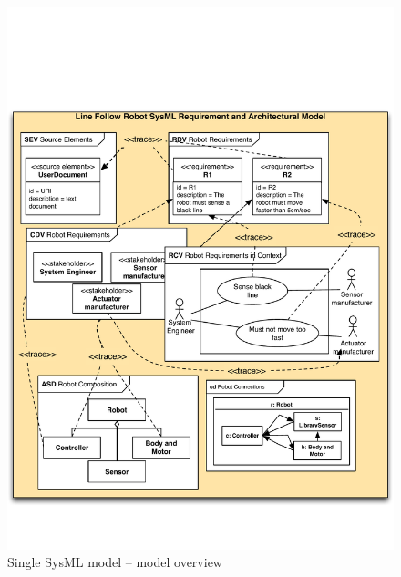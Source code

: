 \begin{description}
\begin{figure}
	\centering
	\includegraphics[scale=0.7]{figures/RE_1}
\caption{Single SysML model -- model overview}
\label{fig:re-singlesysml}
\end{figure}


\end{description}
